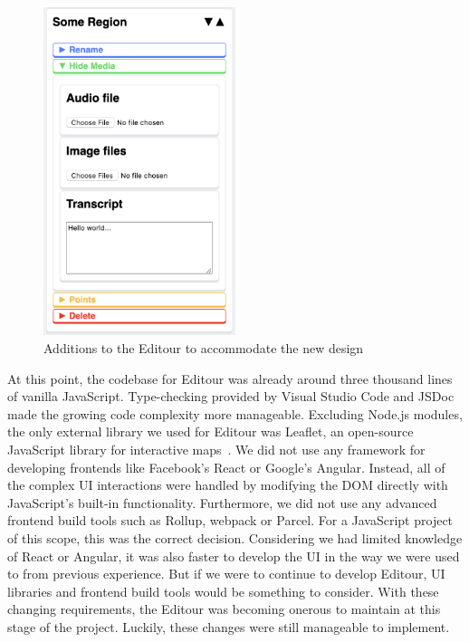 \documentclass[a4paper, 10pt, american, titlepage]{article}
\begin{document}
\begin{figure}[h]
	\centering
	\includegraphics[width=0.5\textwidth]{editour-additions.png}
	\caption{Additions to the Editour to accommodate the new design}
	\label{fig:editourAdditions}
\end{figure}

At this point, the codebase for Editour was already around three thousand lines
of vanilla JavaScript. Type-checking provided by Visual Studio Code and JSDoc
made the growing code complexity more manageable. Excluding Node.js modules, the
only external library we used for Editour was Leaflet, an open-source JavaScript
library for interactive maps~\autocite{leafletjs}. We did not use any framework
for developing frontends like Facebook's React or Google's Angular. Instead, all
of the complex UI interactions were handled by modifying the DOM directly with
JavaScript's built-in functionality. Furthermore, we did not use any advanced
frontend build tools such as Rollup, webpack or Parcel. For a JavaScript project
of this scope, this was the correct decision. Considering we had limited
knowledge of React or Angular, it was also faster to develop the UI in the
way we were used to from previous experience. But if we were to continue to
develop Editour, UI libraries and frontend build tools would be something to
consider. With these changing requirements, the Editour was becoming onerous to
maintain at this stage of the project. Luckily, these changes were still
manageable to implement.
\end{document}
